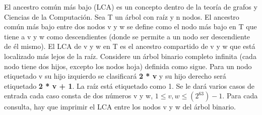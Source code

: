 
El ancestro común más bajo (LCA) es un concepto dentro de la teoría de grafos y Ciencias de la Computación. Sea T un árbol con raíz y n nodos. El ancestro común más bajo entre dos nodos v y w se define como el nodo más bajo en T que tiene a v y w como descendientes (donde se permite a un nodo ser descendiente de él mismo).
El LCA de v y w en T es el ancestro compartido de v y w que está localizado más lejos de la raíz. 
Considere un árbol binario completo infinita (cada nodo tiene dos hijos, excepto los nodos hoja) definida como sigue. Para un nodo etiquetado v su hijo izquierdo se clasificará \textbf{2 * v} y su hijo derecho será etiquetado \textbf{2 * v + 1}. La raíz está etiquetado como 1.
Se le dará varios casos de entrada cada caso consta de dos números v y w, $1 \leq v, w \leq (2^{63})-1$. Para cada consulta, hay que imprimir el LCA entre los nodos v y w del árbol binario.

\datos

